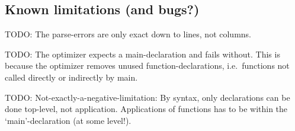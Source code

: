 \subsection{Known limitations (and bugs?)}
TODO: The parse-errors are only exact down to lines, not columns.

TODO: The optimizer expects a main-declaration and fails without. This is because the optimizer removes unused function-declarations, i.e.\ functions not called directly or indirectly by main.

TODO: Not-exactly-a-negative-limitation: By syntax, only declarations can be done top-level, not application. Applications of functions has to be within the `main'-declaration (at some level!).
